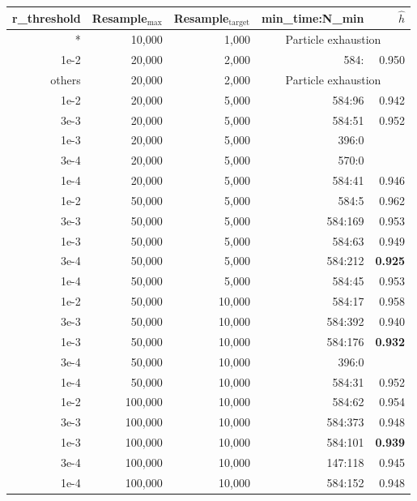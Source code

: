 \documentclass[12pt]{article}
\begin{document}
\begin{tabular*}{1.0\linewidth}{rrrrr}
  r\_threshold& Resample$_{\text{max}}$ & Resample$_{\text{target}}$ &min\_time:N\_min &
                                                                    $\hat
                                                                    h$ \\
                                                                    \hline
  *  & 10,000 & 1,000 & \multicolumn{2}{c}{Particle exhaustion} \\
                        \hline
  1e-2  & 20,000 & 2,000 & 584: & 0.950 \\
  others  & 20,000 & 2,000 & \multicolumn{2}{c}{Particle exhaustion} \\
                        \hline 
  1e-2 & 20,000 & 5,000 & 584:96 & 0.942   \\
  3e-3 & 20,000 & 5,000 & 584:51 & 0.952   \\
  1e-3 & 20,000 & 5,000 & 396:0 &   \\
  3e-4 & 20,000 & 5,000 & 570:0 &   \\
  1e-4 & 20,000 & 5,000 & 584:41 & 0.946  \\ \hline
                        \hline 
  1e-2 & 50,000 & 5,000 & 584:5 & 0.962 \\
  3e-3 & 50,000 & 5,000 & 584:169 & 0.953 \\
  1e-3 & 50,000 & 5,000 & 584:63 & 0.949  \\
  3e-4 & 50,000 & 5,000 & 584:212 & \textbf{0.925}  \\
  1e-4 & 50,000 & 5,000 & 584:45 & 0.953  \\ \hline
                        \hline
  1e-2 & 50,000 & 10,000 & 584:17  & 0.958  \\
  3e-3 & 50,000 & 10,000 & 584:392 & 0.940  \\
  1e-3 & 50,000 & 10,000 & 584:176 & \textbf{0.932}  \\
  3e-4 & 50,000 & 10,000 & 396:0   &        \\
  1e-4 & 50,000 & 10,000 & 584:31  & 0.952  \\ \hline
  1e-2 & 100,000 & 10,000 & 584:62  & 0.954          \\
  3e-3 & 100,000 & 10,000 & 584:373 & 0.948          \\
  1e-3 & 100,000 & 10,000 & 584:101 & \textbf{0.939} \\
  3e-4 & 100,000 & 10,000 & 147:118 & 0.945          \\
  1e-4 & 100,000 & 10,000 & 584:152 & 0.948          \\ \hline

\end{tabular*}
\end{document}
